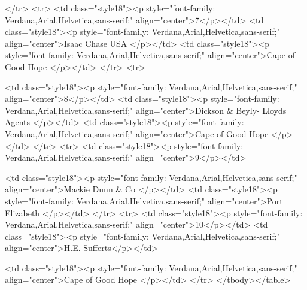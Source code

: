               </tr>
              <tr>
                <td class="style18"><p style="font-family: Verdana,Arial,Helvetica,sans-serif;" align="center">7</p></td>
                <td class="style18"><p style="font-family: Verdana,Arial,Helvetica,sans-serif;" align="center">Isaac Chase USA </p></td>
                <td class="style18"><p style="font-family: Verdana,Arial,Helvetica,sans-serif;" align="center">Cape of Good Hope </p></td>
              </tr>
              <tr>

                <td class="style18"><p style="font-family: Verdana,Arial,Helvetica,sans-serif;" align="center">8</p></td>
                <td class="style18"><p style="font-family: Verdana,Arial,Helvetica,sans-serif;" align="center">Dickson & Beyly- Lloyds Agents </p></td>
                <td class="style18"><p style="font-family: Verdana,Arial,Helvetica,sans-serif;" align="center">Cape of Good Hope </p></td>
              </tr>
              <tr>
                <td class="style18"><p style="font-family: Verdana,Arial,Helvetica,sans-serif;" align="center">9</p></td>

                <td class="style18"><p style="font-family: Verdana,Arial,Helvetica,sans-serif;" align="center">Mackie Dunn & Co </p></td>
                <td class="style18"><p style="font-family: Verdana,Arial,Helvetica,sans-serif;" align="center">Port Elizabeth </p></td>
              </tr>
              <tr>
                <td class="style18"><p style="font-family: Verdana,Arial,Helvetica,sans-serif;" align="center">10</p></td>
                <td class="style18"><p style="font-family: Verdana,Arial,Helvetica,sans-serif;" align="center">H.E. Sufferts</p></td>

                <td class="style18"><p style="font-family: Verdana,Arial,Helvetica,sans-serif;" align="center">Cape of Good Hope </p></td>
              </tr>
            </tbody></table>
                